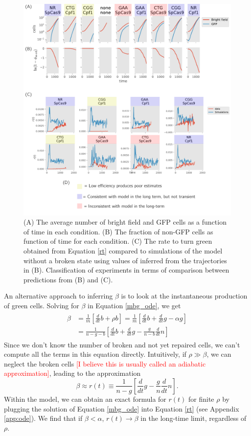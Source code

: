 \documentclass{article}
\begin{document}
\begin{figure}[h!]
\centering
\includegraphics[scale=0.6]{fig1.pdf}
\caption{(A) The average number of bright field and GFP cells as a function of time in each condition.  (B) The fraction of non-GFP cells as function of time for each condition.  (C) The rate to turn green obtained from Equation \ref{rt} compared to simulations of the model without a broken state using values of inferred from the trajectories in (B). Classification of experiments in terms of comparison between predictions from (B) and (C). }\label{fig:1}
\end{figure}


An alternative approach to inferring $\beta$ is to look at the instantaneous  production of green cells. Solving for $\beta$ in Equation \ref{mbg_ode}, we get 
\begin{align}
\begin{split}
\beta &= \frac{1}{m}\left[\frac{d}{dt}b +\rho b\right] =  \frac{1}{m}\left[\frac{d}{dt}b +\frac{d}{dt}g - \alpha g\right] \\
&= \frac{1}{n-g-b}\left[\frac{d}{dt}b +\frac{d}{dt}g -\frac{g}{n-b} \frac{d}{dt}n\right]
\end{split}
\end{align}
Since we don't know the number of broken and not yet repaired cells, we can't compute all the terms in this equation directly. Intuitively, if $\rho \gg \beta$, we can neglect the broken cells \textcolor{red}{[I believe this is usually called an adiabatic  approximation]}, leading to the approximation
\begin{equation}\label{rt}
\beta \approx r(t) \equiv \frac{1}{n-g}\left[\frac{d}{dt}g -\frac{g}{n} \frac{d}{dt}n\right]. 
\end{equation}
Within the model, we can obtain an exact formula for $r(t)$ for finite $\rho$ by plugging the solution of Equation \ref{mbg_ode} into Equation \ref{rt} (see Appendix \ref{app:ode}).  We find that if $\beta < \alpha$, $r(t) \to \beta$ in the long-time limit, regardless of $\rho$. 
\end{document}
